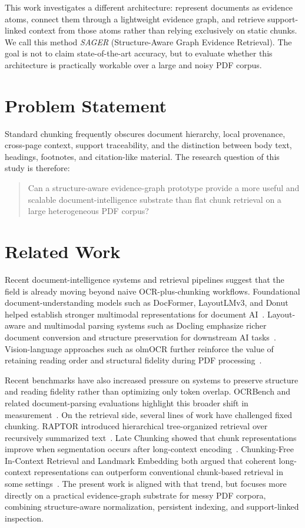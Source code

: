 \documentclass[conference]{IEEEtran}
\begin{document}
This work investigates a different architecture: represent documents as evidence atoms, connect them through a lightweight evidence graph, and retrieve support-linked context from those atoms rather than relying exclusively on static chunks. We call this method \textit{SAGER} (Structure-Aware Graph Evidence Retrieval). The goal is not to claim state-of-the-art accuracy, but to evaluate whether this architecture is practically workable over a large and noisy PDF corpus.

\section{Problem Statement}
Standard chunking frequently obscures document hierarchy, local provenance, cross-page context, support traceability, and the distinction between body text, headings, footnotes, and citation-like material. The research question of this study is therefore:

\begin{quote}
Can a structure-aware evidence-graph prototype provide a more useful and scalable document-intelligence substrate than flat chunk retrieval on a large heterogeneous PDF corpus?
\end{quote}

\section{Related Work}
Recent document-intelligence systems and retrieval pipelines suggest that the field is already moving beyond naive OCR-plus-chunking workflows. Foundational document-understanding models such as DocFormer, LayoutLMv3, and Donut helped establish stronger multimodal representations for document AI~\cite{docformer2021,layoutlmv32022,donut2022}. Layout-aware and multimodal parsing systems such as Docling emphasize richer document conversion and structure preservation for downstream AI tasks~\cite{docling2024,docling2025}. Vision-language approaches such as olmOCR further reinforce the value of retaining reading order and structural fidelity during PDF processing~\cite{olmocr2025}.

Recent benchmarks have also increased pressure on systems to preserve structure and reading fidelity rather than optimizing only token overlap. OCRBench and related document-parsing evaluations highlight this broader shift in measurement~\cite{ocrbench2024,paddleocrvl2025}. On the retrieval side, several lines of work have challenged fixed chunking. RAPTOR introduced hierarchical tree-organized retrieval over recursively summarized text~\cite{raptor2024}. Late Chunking showed that chunk representations improve when segmentation occurs after long-context encoding~\cite{latechunking2024}. Chunking-Free In-Context Retrieval and Landmark Embedding both argued that coherent long-context representations can outperform conventional chunk-based retrieval in some settings~\cite{chunkfree2024,landmark2024}. The present work is aligned with that trend, but focuses more directly on a practical evidence-graph substrate for messy PDF corpora, combining structure-aware normalization, persistent indexing, and support-linked inspection.
\end{document}
